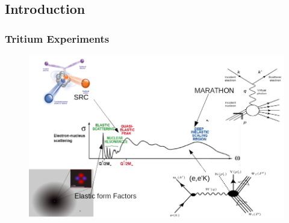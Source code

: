 \documentclass{beamer}
\begin{document}
\subsection[Introduction]{Introduction}

\begin{frame}
\frametitle{Tritium Experiments}
\vspace{-15pt}
\begin{figure}
	\includegraphics[width =12cm]{../images/tritium_ov}
\end{figure}
\end{frame}
\end{document}
